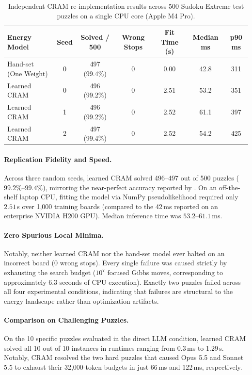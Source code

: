 \documentclass{article} %
\begin{document}
\begin{table}[ht]
\centering
\small
\caption{Independent CRAM re-implementation results across 500 Sudoku-Extreme test puzzles on a single CPU core (Apple M4 Pro).}
\label{tab:cram_results}
\begin{tabular}{lcccccc}
\toprule
\textbf{Energy Model} & \textbf{Seed} & \textbf{Solved / 500} & \textbf{Wrong Stops} & \textbf{Fit Time (s)} & \textbf{Median ms} & \textbf{p90 ms} \\
\midrule
Hand-set (One Weight) & 0 & 497 (99.4\%) & 0 & 0.00 & 42.8 & 311 \\
Learned CRAM          & 0 & 496 (99.2\%) & 0 & 2.51 & 53.2 & 351 \\
Learned CRAM          & 1 & 496 (99.2\%) & 0 & 2.52 & 61.1 & 397 \\
Learned CRAM          & 2 & 497 (99.4\%) & 0 & 2.52 & 54.2 & 425 \\
\bottomrule
\end{tabular}
\end{table}

\paragraph{Replication Fidelity and Speed.}
Across three random seeds, learned CRAM solved 496--497 out of 500 puzzles ($99.2\%$--$99.4\%$), mirroring the near-perfect accuracy reported by \citet{hoover2026classical}. On an off-the-shelf laptop CPU, fitting the model via NumPy pseudolikelihood required only $2.51$\,s over 1,000 training boards (compared to the 42\,ms reported on an enterprise NVIDIA H200 GPU). Median inference time was $53.2$--$61.1$\,ms.

\paragraph{Zero Spurious Local Minima.}
Notably, neither learned CRAM nor the hand-set model ever halted on an incorrect board (0 wrong stops). Every single failure was caused strictly by exhausting the search budget ($10^7$ focused Gibbs moves, corresponding to approximately 6.3 seconds of CPU execution). Exactly two puzzles failed across all four experimental conditions, indicating that failures are structural to the energy landscape rather than optimization artifacts.

\paragraph{Comparison on Challenging Puzzles.}
On the 10 specific puzzles evaluated in the direct LLM condition, learned CRAM solved all 10 out of 10 instances in runtimes ranging from 0.3\,ms to 1.29\,s. Notably, CRAM resolved the two hard puzzles that caused Opus 5.5 and Sonnet 5.5 to exhaust their 32,000-token budgets in just 66\,ms and 122\,ms, respectively.
\end{document}
